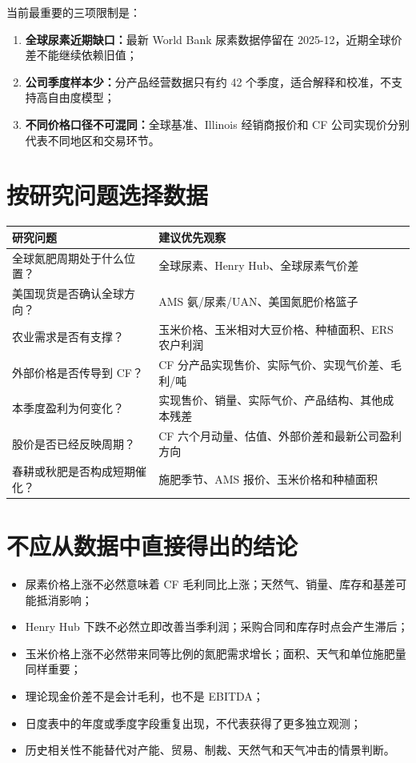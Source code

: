 \documentclass[11pt,a4paper]{ctexart}
\begin{document}
当前最重要的三项限制是：

\begin{enumerate}
  \item \textbf{全球尿素近期缺口：}最新 World Bank 尿素数据停留在 2025-12，近期全球价差不能继续依赖旧值；
  \item \textbf{公司季度样本少：}分产品经营数据只有约 42 个季度，适合解释和校准，不支持高自由度模型；
  \item \textbf{不同价格口径不可混同：}全球基准、Illinois 经销商报价和 CF 公司实现价分别代表不同地区和交易环节。
\end{enumerate}

\section{按研究问题选择数据}

\begin{center}
\small
\begin{tabularx}{\textwidth}{L{4.1cm}Y}
\toprule
研究问题 & 建议优先观察 \\
\midrule
全球氮肥周期处于什么位置？ & 全球尿素、Henry Hub、全球尿素气价差 \\
美国现货是否确认全球方向？ & AMS 氨/尿素/UAN、美国氮肥价格篮子 \\
农业需求是否有支撑？ & 玉米价格、玉米相对大豆价格、种植面积、ERS 农户利润 \\
外部价格是否传导到 CF？ & CF 分产品实现售价、实际气价、实现气价差、毛利/吨 \\
本季度盈利为何变化？ & 实现售价、销量、实际气价、产品结构、其他成本残差 \\
股价是否已经反映周期？ & CF 六个月动量、估值、外部价差和最新公司盈利方向 \\
春耕或秋肥是否构成短期催化？ & 施肥季节、AMS 报价、玉米价格和种植面积 \\
\bottomrule
\end{tabularx}
\normalsize
\end{center}

\section{不应从数据中直接得出的结论}

\begin{itemize}
  \item 尿素价格上涨不必然意味着 CF 毛利同比上涨；天然气、销量、库存和基差可能抵消影响；
  \item Henry Hub 下跌不必然立即改善当季利润；采购合同和库存时点会产生滞后；
  \item 玉米价格上涨不必然带来同等比例的氮肥需求增长；面积、天气和单位施肥量同样重要；
  \item 理论现金价差不是会计毛利，也不是 EBITDA；
  \item 日度表中的年度或季度字段重复出现，不代表获得了更多独立观测；
  \item 历史相关性不能替代对产能、贸易、制裁、天然气和天气冲击的情景判断。
\end{itemize}
\end{document}
